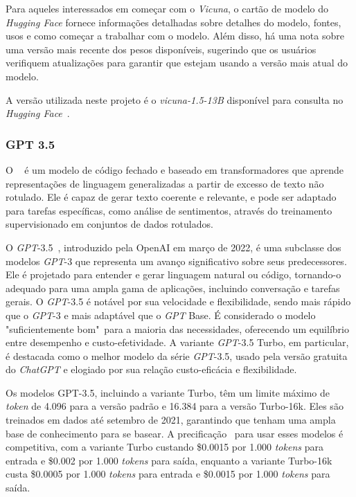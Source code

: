 Para aqueles interessados em começar com o \textit{Vicuna}, o cartão de modelo do \textit{Hugging Face} fornece informações detalhadas sobre detalhes do modelo, fontes, usos e como começar a trabalhar com o modelo. Além disso, há uma nota sobre uma versão mais recente dos pesos disponíveis, sugerindo que os usuários verifiquem atualizações para garantir que estejam usando a versão mais atual do modelo.

A versão utilizada neste projeto é o \textit{vicuna-1.5-13B} disponível para consulta no \textit{Hugging Face}~\cite{vicuna1513b}.

\subsubsection{GPT 3.5}
\label{cap:fund_teorica:sec:modelos:subsec:gpt}

O ~\cite{enwiki:1226113577} é um modelo de código fechado e baseado em transformadores que aprende representações de linguagem generalizadas a partir de excesso de texto não rotulado. Ele é capaz de gerar texto coerente e relevante, e pode ser adaptado para tarefas específicas, como análise de sentimentos, através do treinamento supervisionado em conjuntos de dados rotulados.

O \textit{GPT}-3.5~\cite{openai:gpt35turbo}, introduzido pela OpenAI em março de 2022, é uma subclasse dos modelos \textit{GPT}-3 que representa um avanço significativo sobre seus predecessores. Ele é projetado para entender e gerar linguagem natural ou código, tornando-o adequado para uma ampla gama de aplicações, incluindo conversação e tarefas gerais. O \textit{GPT}-3.5 é notável por sua velocidade e flexibilidade, sendo mais rápido que o \textit{GPT}-3 e mais adaptável que o \textit{GPT} Base. É considerado o modelo "suficientemente bom"\ para a maioria das necessidades, oferecendo um equilíbrio entre desempenho e custo-efetividade. A variante \textit{GPT}-3.5 Turbo, em particular, é destacada como o melhor modelo da série \textit{GPT}-3.5, usado pela versão gratuita do \textit{ChatGPT} e elogiado por sua relação custo-eficácia e flexibilidade.

Os modelos GPT-3.5, incluindo a variante Turbo, têm um limite máximo de \textit{token} de 4.096 para a versão padrão e 16.384 para a versão Turbo-16k. Eles são treinados em dados até setembro de 2021, garantindo que tenham uma ampla base de conhecimento para se basear. A precificação~\cite{openai:gptpricing} para usar esses modelos é competitiva, com a variante Turbo custando \$0.0015 por 1.000 \textit{tokens} para entrada e \$0.002 por 1.000 \textit{tokens} para saída, enquanto a variante Turbo-16k custa \$0.0005 por 1.000 \textit{tokens} para entrada e \$0.0015 por 1.000 \textit{tokens} para saída.

